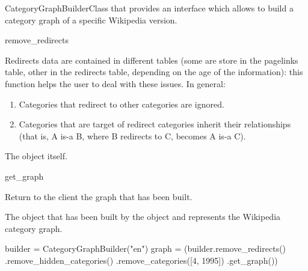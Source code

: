 \begin{classdoc}{CategoryGraphBuilder}{Class that provides an interface which allows to build a category graph of a specific Wikipedia version.}
\begin{classmethod}{remove\_redirects}{}
\begin{functiondescription}
                        Redirects data are contained in different tables (some are store in the pagelinks table, other in the redirects table, depending on the age of the information): this function helps the user to deal with these issues. In general:
                        \begin{enumerate}
                            \item Categories that redirect to other categories are ignored.
                            \item Categories that are target of redirect categories inherit their  relationships (that is, A is-a B, where B redirects to C, becomes A is-a C).
                        \end{enumerate}
                    \end{functiondescription}
                    
                    \emptyfunctionparameters{}
                    
                    \begin{functionoutput}
                        The  object itself.
                    \end{functionoutput}
                \end{classmethod}
                \item \begin{classmethod}{get\_graph}{}
                
                    \begin{functiondescription}
                        Return to the client the graph that has been built.
                    \end{functiondescription}
                    
                    \emptyfunctionparameters{}
                    
                    \begin{functionoutput}
                        The  object that has been built by the  object and represents the Wikipedia category graph.
                    \end{functionoutput}
                    
                    \begin{functionexample}
builder = CategoryGraphBuilder("en")
graph = (builder.remove_redirects()
                .remove_hidden_categories()
                .remove_categories([4, 1995])
                .get_graph())
                    \end{functionexample}
                \end{classmethod}
            \end{classdoc}
